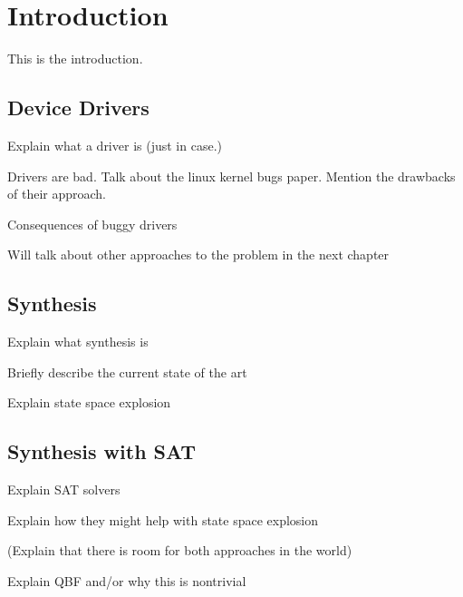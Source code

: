 \chapter{Introduction}

This is the introduction.

\section{Device Drivers}

Explain what a driver is (just in case.)

Drivers are bad. Talk about the linux kernel bugs paper. Mention the drawbacks of their approach.

Consequences of buggy drivers

Will talk about other approaches to the problem in the next chapter

\section{Synthesis}

Explain what synthesis is

Briefly describe the current state of the art

Explain state space explosion

\section{Synthesis with SAT}

Explain SAT solvers

Explain how they might help with state space explosion

(Explain that there is room for both approaches in the world)

Explain QBF and/or why this is nontrivial

